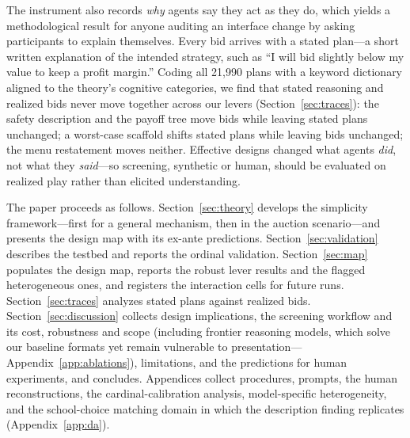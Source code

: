 The instrument also records \emph{why} agents say they act as they do, which yields a methodological result for anyone auditing an interface change by asking participants to explain themselves. Every bid arrives with a stated plan---a short written explanation of the intended strategy, such as ``I will bid slightly below my value to keep a profit margin.'' Coding all 21{,}990 plans with a keyword dictionary aligned to the theory's cognitive categories, we find that stated reasoning and realized bids never move together across our levers (Section~\ref{sec:traces}): the safety description and the payoff tree move bids while leaving stated plans unchanged; a worst-case scaffold shifts stated plans while leaving bids unchanged; the menu restatement moves neither. Effective designs changed what agents \emph{did}, not what they \emph{said}---so screening, synthetic or human, should be evaluated on realized play rather than elicited understanding.

The paper proceeds as follows. Section~\ref{sec:theory} develops the simplicity framework---first for a general mechanism, then in the auction scenario---and presents the design map with its ex-ante predictions. Section~\ref{sec:validation} describes the testbed and reports the ordinal validation. Section~\ref{sec:map} populates the design map, reports the robust lever results and the flagged heterogeneous ones, and registers the interaction cells for future runs. Section~\ref{sec:traces} analyzes stated plans against realized bids. Section~\ref{sec:discussion} collects design implications, the screening workflow and its cost, robustness and scope (including frontier reasoning models, which solve our baseline formats yet remain vulnerable to presentation---Appendix~\ref{app:ablations}), limitations, and the predictions for human experiments, and concludes. Appendices collect procedures, prompts, the human reconstructions, the cardinal-calibration analysis, model-specific heterogeneity, and the school-choice matching domain in which the description finding replicates (Appendix~\ref{app:da}).
